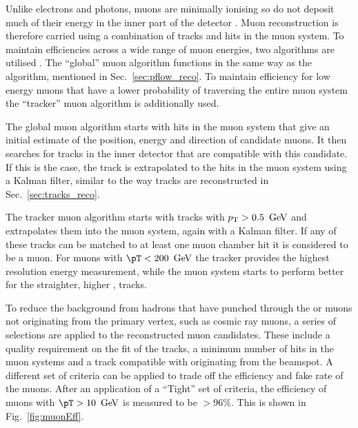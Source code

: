 Unlike electrons and photons, muons are minimally ionising so do not
deposit much of their energy in the inner part of the detector
\cite{Chatrchyan:2008aa}. Muon reconstruction is therefore carried
using a combination of tracks and hits in the muon system. To maintain
efficiencies across a wide range of muon energies, two algorithms are
utilised \cite{1748-0221-7-10-P10002}. The ``global'' muon algorithm
functions in the same way as the \PF algorithm, mentioned in
Sec.~\ref{sec:pflow_reco}. To maintain efficiency for low energy muons
that have a lower probability of traversing the entire muon system
the ``tracker'' muon algorithm is additionally used.

The global muon algorithm starts with hits in the muon system that
give an initial estimate of the position, energy and direction of
candidate muons. It then searches for tracks in the inner detector
that are compatible with this candidate. If this is the case, the
track is extrapolated to the hits in the muon system using a Kalman
filter, similar to the way tracks are reconstructed in
Sec.~\ref{sec:tracks_reco}. 

The tracker muon algorithm starts with tracks with ${p_{\text T}}>0.5~\mathrm{\,Ge\kern -0.1em V}$ and
extrapolates them into the muon system, again with a Kalman filter. If
any of these tracks can be matched to at least one muon chamber hit it
is considered to be a muon. For muons with $\pT<200~\gev$ the tracker
provides the highest resolution energy measurement, while the muon
system starts to perform better for the straighter, higher \pT,
tracks.

To reduce the background from hadrons that have punched through the
\HCAL or muons not originating from the primary vertex, such as cosmic
ray muons, a series of selections are applied to the reconstructed
muon candidates. These include a quality requirement on the fit of the
tracks, a minimum number of hits in the muon systems and a track
compatible with originating from the beamspot. A different set of
criteria can be applied to trade off the efficiency and fake rate of
the muons. After an application of a ``Tight'' set of criteria, the
efficiency of muons with $\pT>10~\gev$ is measured to be $>96\%$. This
is shown in Fig.~\ref{fig:muonEff}.

